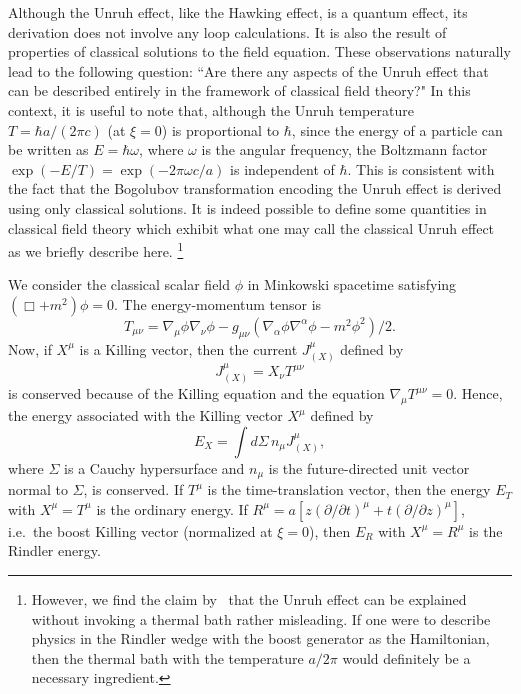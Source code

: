 \documentclass[12pt,nofootinbib,floatfix,aps,prd,showpacs,amsmath,amssymb,eqsecnum]{revtex4-2}
\begin{document}
Although the Unruh effect, like the Hawking effect, is a quantum effect,
its derivation does not involve any loop calculations.  
It is also the result of 
properties of classical solutions to the field equation.  These
observations naturally lead to the following question:
``Are there any aspects of the Unruh effect that can be described
entirely in the framework of classical field theory?" 
In this context, it is useful to note that, although the Unruh 
temperature $T = \hbar a/(2\pi c)$ (at $\xi=0$) is proportional 
to $\hbar$, since the energy of a particle can
be written as $E= \hbar \omega$, where $\omega$ is the angular frequency,
the Boltzmann factor $\exp(-E/ T) = \exp(-2\pi\omega c /a )$ is
independent of
$\hbar$.  This is consistent with the fact that the Bogolubov
transformation encoding the Unruh effect 
is derived using only classical solutions.
It is indeed
possible to define some quantities in classical field theory which 
exhibit what one may call the classical Unruh
effect~\cite{Higuchietal93b} as we briefly describe here.
\footnote{However, we
find the claim by~\textcite{Barutetal90} that the Unruh effect can be
explained without invoking a thermal bath rather misleading.  If one
were to describe physics in the Rindler wedge with the boost generator as the Hamiltonian, then the thermal bath with the temperature $a/2\pi$ 
would definitely be a necessary ingredient.}

We consider the classical scalar field $\phi$ in Minkowski spacetime
satisfying $(\Box +m^2)\phi = 0$.  The energy-momentum tensor is
\begin{equation}
T_{\mu\nu} = \nabla_\mu\phi\nabla_\nu\phi - g_{\mu\nu}
(\nabla_\alpha\phi\nabla^\alpha \phi - m^2\phi^2)/2.
\end{equation}
Now, if 
$X^\mu$ is a Killing vector, then the current $J^\mu_{(X)}$ defined by
\begin{equation}
J^\mu_{(X)} = X_\nu T^{\mu\nu}
\end{equation}
is conserved because of the Killing equation and the equation
$\nabla_\mu T^{\mu\nu} = 0$.  Hence, the energy associated with the
Killing vector $X^\mu$ defined by
\begin{equation}
E_X = \int d\Sigma\, n_\mu J^\mu_{(X)},
\end{equation}
where $\Sigma$ is a Cauchy hypersurface and $n_\mu$ is the future-directed
unit vector normal to
$\Sigma$, is conserved.  
If $T^\mu$ is the time-translation vector, then the energy
$E_T$ with $X^\mu=T^\mu$ is the ordinary energy.  If 
$R^\mu = a [z(\partial/\partial t)^\mu + t(\partial/\partial z)^\mu]$, 
i.e.~the boost Killing vector (normalized at $\xi=0$), 
then $E_R$ with $X^\mu=R^\mu$ is the Rindler energy.
\end{document}
